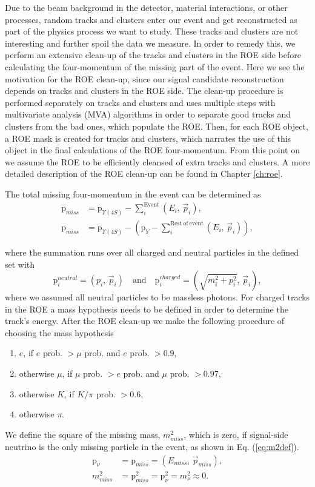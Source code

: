 \documentclass[headings=standardclasses,headings=big,oneside,a4paper,openany,12pt]{scrbook}
\begin{document}
Due to the beam background in the detector, material interactions, or other processes, random tracks and clusters enter our event and get reconstructed as part of the physics process we want to study. These tracks and clusters are not interesting and further spoil the data we measure. In order to remedy this, we perform an extensive clean-up of the tracks and clusters in the ROE side before calculating the four-momentum of the missing part of the event. Here we see the motivation for the ROE clean-up, since our signal candidate reconstruction depends on tracks and clusters in the ROE side. The clean-up procedure is performed separately on tracks and clusters and uses multiple steps with multivariate analysis (MVA) algorithms in order to separate good tracks and clusters from the bad ones, which populate the ROE. Then, for each ROE object, a ROE mask is created for tracks and clusters, which narrates the use of this object in the final calculations of the ROE four-momentum. From this point on we assume the ROE to be efficiently cleansed of extra tracks and clusters. A more detailed description of the ROE clean-up can be found in Chapter \ref{ch:roe}. 

The total missing four-momentum in the event can be determined as
\begin{align}
\mathrm{p}_{miss} &= \mathrm{p}_{\Upsilon(4S)} - \sum_i^{\mathrm{Event}}\left(E_i,\,\vec{p}_i \right),\\
\label{eq:ROEloop}
\mathrm{p}_{miss} &= \mathrm{p}_{\Upsilon(4S)} - \left(\mathrm{p}_{Y} -\sum_i^{\mathrm{Rest~of~event}}\left(E_i,\,\vec{p}_i \right)\right),
\end{align}

where the summation runs over all charged and neutral particles in the defined set with
\begin{equation}
\mathrm{p}^{neutral}_i = \left(p_i,\, \vec{p}_i \right) \quad \mathrm{and} \quad \mathrm{p}^{charged}_i = \left(\sqrt{m_i^2 + p_i^2},\, \vec{p}_i \right),
\label{eq:pcharged}
\end{equation}
where we assumed all neutral particles to be massless photons. For charged tracks in the ROE a mass hypothesis needs to be defined in order to determine the track's energy. After the ROE clean-up we make the following procedure of choosing the mass hypothesis
\begin{enumerate}
\item $e$, if $e$ prob. $> \mu$ prob. and $e$ prob. $> 0.9$,
\item otherwise $\mu$, if $\mu$ prob. $> e$ prob. and $\mu$ prob. $> 0.97$,
\item otherwise $K$, if $K/\pi$ prob. $> 0.6$,
\item otherwise $\pi$.
\end{enumerate} 
We define the square of the missing mass, $m_{miss}^2$, which is zero, if signal-side neutrino is the only missing particle in the event, as shown in Eq. (\ref{eq:m2def}).
\begin{align}
\label{eq:nuold}
\mathrm{p}_\nu &= \mathrm{p}_{miss} = \left(E_{miss},\,\vec{p}_{miss} \right),\\
\label{eq:m2def}
m_{miss}^2 &= \mathrm{p}_{miss}^2 = \mathrm{p}_{\nu}^2 = m_\nu^2 \approx 0.
\end{align}
\end{document}
